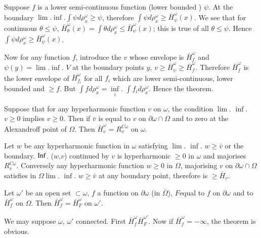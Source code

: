 Suppose $f$ is a lower semi-continuous function (lower bounded )
$\psi$. At the boundary $\lim. \inf. \int \psi d \rho^\omega_x \ge
\psi$, therefore $\int \psi d \rho^\omega_x \ge \bar{H}^\omega_\psi
(x)$. We see that for continuous $\theta \le \psi$,
$\bar{H}^\omega_\theta(x) = \int \theta d \rho^\omega_x \le
\bar{H}^\omega_\psi (x)$; this is true of all $\theta \le \psi$. Hence
$\int \psi d \rho^\omega_x \ge \bar{H}^\omega_\psi(x)$. 

Now for any function $f$, introduce the $v$ whose envelope is
$\bar{H}^\omega_f$ and $\psi(y) = \lim. \inf$. $V$ at the boundary
points $y$, $v \ge \bar{H}^\omega_\psi \ge
\bar{H}^\omega_f$. Therefore $\bar{H}^\omega_f$ is the lower envelope
of $\bar{H}^\omega_{f_i}$ for all $f_i$ which are lower
semi-continuous, lower bounded and $\ge f$. But $\int f d \rho^\omega_x=
\inf \limits_{i}$. $\int f_i d \rho^\omega_x$. Hence the theorem. 

\begin{prop}\label{p4:chap4:sec15:prop5}%
  Suppose that for any hyperharmonic function $v$ on $\omega$, the
  condition $\lim$. $\inf$. $v \ge 0$ implies $v \ge 0$. Then if
  $\bar{v}$ is equal to $v$ on $\partial \omega \cap \Omega$ and to
  zero at the Alexandroff point of $\Omega$. Then $\bar{H}^\omega_v =
  R^{C \omega}_v$ on $\omega$. 
\end{prop}

Let $w$ be any hyperharmonic function in $\omega$ satisfying
$\lim$. $\inf$. $w \ge \bar{v}$ or the boundary. $\operatorname{Inf}$. ($w$,$v$)
continued by $v$ is hyperharmonic $\ge 0$ in $\omega$ and majorises
$R^{C \omega}_v$. Conversely any hyperharmonic function $w \ge 0$ in
$\Omega$, majorising $v$ on $\partial \omega \cap \Omega$ satisfies in
$\Omega \lim$. $\inf$. $w \ge \bar{v}$ at any boundary point,
therefore is $\ge \bar{H}_v$. 

\begin{thm}\label{p4:chap4:sec15:thm10}
  Let $\omega'$ be an open set $\subset \omega$, $f$ a function on
  $\partial \omega$ (in $\bar{\Omega}$), $F$\pageoriginale equal to $f$ on $\partial
  \omega$ and to $\bar{H}^\omega_f$ on $\Omega$. Then
  $\bar{H}^\omega_f = \bar{H}^\omega_F$ on $\omega'$. 
\end{thm}

We may suppose $\omega$, $\omega'$ connected. First $\bar{H}^\omega_f
\bar{H}^{\omega'}_F$. Now if $\bar{H}^\omega_f = - \infty$, the theorem
is obvious. 

